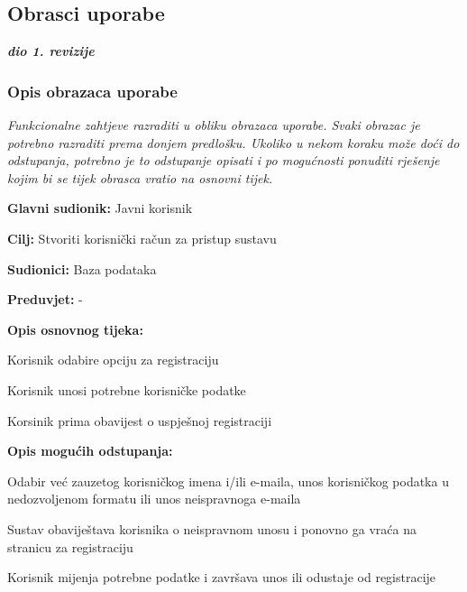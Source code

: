 \eject 



\subsection{Obrasci uporabe}

\textbf{\textit{dio 1. revizije}}

\subsubsection{Opis obrazaca uporabe}
\textit{Funkcionalne zahtjeve razraditi u obliku obrazaca uporabe. Svaki obrazac je potrebno razraditi prema donjem predlošku. Ukoliko u nekom koraku može doći do odstupanja, potrebno je to odstupanje opisati i po mogućnosti ponuditi rješenje kojim bi se tijek obrasca vratio na osnovni tijek.}\\


\noindent {}
\begin{packed_item}
	\item \textbf{Glavni sudionik: } Javni korisnik
	\item  \textbf{Cilj:} Stvoriti korisnički račun za pristup sustavu
	\item  \textbf{Sudionici:} Baza podataka
	\item  \textbf{Preduvjet:} -
	\item  \textbf{Opis osnovnog tijeka:}
	
	\item[] \begin{packed_enum}
		
		\item Korisnik odabire opciju za registraciju
		\item Korisnik unosi potrebne korisničke podatke
		\item Korsinik prima obavijest o uspješnoj registraciji
	\end{packed_enum}
	
	\item  \textbf{Opis mogućih odstupanja:}
	
	\item[] \begin{packed_item}
		
		\item[2.a] Odabir već zauzetog korisničkog imena i/ili e-maila, unos korisničkog podatka u nedozvoljenom formatu ili unos neispravnoga e-maila 
		\item[] \begin{packed_enum}
			
			\item Sustav obaviještava korisnika o neispravnom unosu i ponovno ga vraća na stranicu za registraciju
			\item Korisnik mijenja potrebne podatke i završava unos ili odustaje od registracije
			
		\end{packed_enum}
	\end{packed_item}
\end{packed_item}

